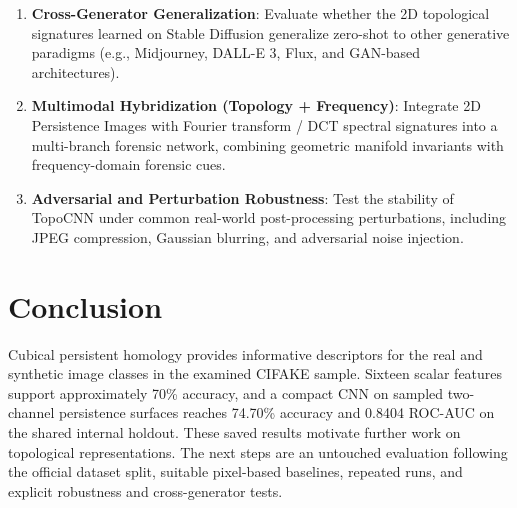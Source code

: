 \documentclass[11pt,a4paper]{article}
\begin{document}
\begin{enumerate}
    \item \textbf{Cross-Generator Generalization}:
    Evaluate whether the 2D topological signatures learned on Stable Diffusion generalize zero-shot to other generative paradigms (e.g., Midjourney, DALL-E 3, Flux, and GAN-based architectures).
    \item \textbf{Multimodal Hybridization (Topology + Frequency)}:
    Integrate 2D Persistence Images with Fourier transform / DCT spectral signatures into a multi-branch forensic network, combining geometric manifold invariants with frequency-domain forensic cues.
    \item \textbf{Adversarial and Perturbation Robustness}:
    Test the stability of TopoCNN under common real-world post-processing perturbations, including JPEG compression, Gaussian blurring, and adversarial noise injection.
\end{enumerate}

\section{Conclusion}
Cubical persistent homology provides informative descriptors for the real and synthetic image classes in the examined CIFAKE sample. Sixteen scalar features support approximately 70\% accuracy, and a compact CNN on sampled two-channel persistence surfaces reaches 74.70\% accuracy and 0.8404 ROC-AUC on the shared internal holdout. These saved results motivate further work on topological representations. The next steps are an untouched evaluation following the official dataset split, suitable pixel-based baselines, repeated runs, and explicit robustness and cross-generator tests.
\end{document}
